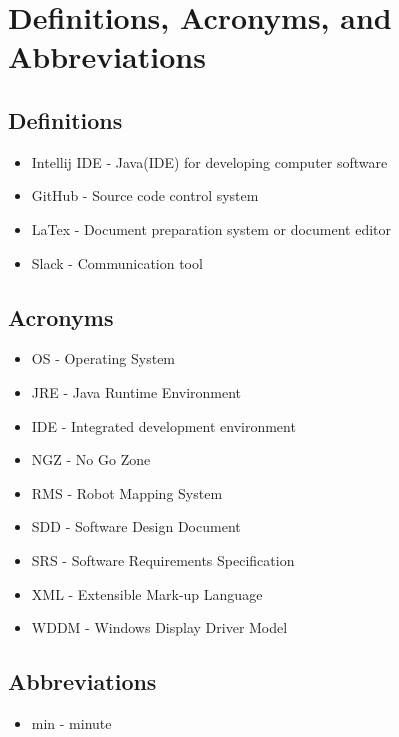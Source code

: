 \section{ Definitions, Acronyms, and Abbreviations}

\subsection{Definitions}
\begin{itemize}
\item Intellij IDE - Java(IDE) for developing computer software
\item GitHub - Source code control system
\item LaTex - Document preparation system or document editor 
\item Slack - Communication tool
\end{itemize}

\subsection{Acronyms}
\begin{itemize}
\item OS - Operating System
\item JRE - Java Runtime Environment
\item IDE - Integrated development environment
\item NGZ - No Go Zone
\item RMS - Robot Mapping System
\item SDD - Software Design Document
\item SRS - Software Requirements Specification
\item XML - Extensible Mark-up Language
\item WDDM - Windows Display Driver Model
\end{itemize}

\subsection{Abbreviations}
\begin{itemize}
	\item min - minute
\end{itemize}
